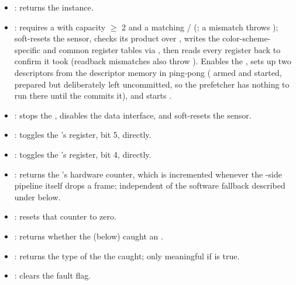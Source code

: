 \begin{itemize}
    \item {}: returns the  instance.
    \item {}: requires a  with capacity $\geq$ 2 and a matching / (; a mismatch throws ); soft-resets the sensor, checks its product  over , writes the color-scheme-specific and common register tables via , then reads every register back to confirm it took (readback mismatches also throw ). Enables the , sets up two descriptors from the descriptor memory in ping-pong ( armed and started,  prepared but deliberately left uncommitted, so the prefetcher has nothing to run there until the  commits it), and starts .
    \item {}: stops the , disables the data interface, and soft-resets the sensor.
    \item {}: toggles the 's  register, bit 5, directly.
    \item {}: toggles the 's  register, bit 4, directly.
    \item {}: returns the 's hardware counter, which is incremented whenever the -side pipeline itself drops a frame; independent of the software fallback described under  below.
    \item {}: resets that counter to zero.
    \item {}: returns whether the  (below) caught an .
    \item {}: returns the type of the  the  caught; only meaningful if  is true.
    \item {}: clears the fault flag.

\end{itemize}
